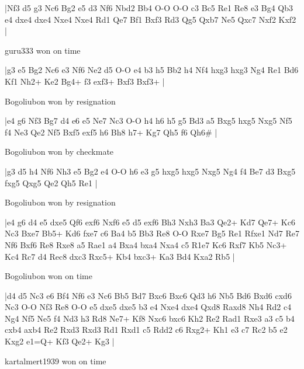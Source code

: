 \makegametitle
|Nf3 d5 g3 Nc6 Bg2 e5 d3 Nf6 Nbd2 Bb4 O-O O-O c3 Bc5 Re1 Re8 e3 Bg4 Qb3 e4 dxe4 dxe4 Nxe4 Nxe4 Rd1 Qe7 Bf1 Bxf3 Rd3 Qg5 Qxb7 Ne5 Qxc7 Nxf2 Kxf2  |

\showboard

guru333 won on time

\makegametitle
|g3 e5 Bg2 Nc6 e3 Nf6 Ne2 d5 O-O e4 b3 h5 Bb2 h4 Nf4 hxg3 hxg3 Ng4 Re1 Bd6 Kf1 Nh2+ Ke2 Bg4+ f3 exf3+ Bxf3 Bxf3+  |

\showboard

Bogoliubon won by resignation

\makegametitle
|e4 g6 Nf3 Bg7 d4 e6 e5 Ne7 Nc3 O-O h4 h6 h5 g5 Bd3 a5 Bxg5 hxg5 Nxg5 Nf5 f4 Ne3 Qe2 Nf5 Bxf5 exf5 h6 Bh8 h7+ Kg7 Qh5 f6 Qh6\#  |

\showboard

Bogoliubon won by checkmate

\makegametitle
|g3 d5 h4 Nf6 Nh3 e5 Bg2 e4 O-O h6 e3 g5 hxg5 hxg5 Nxg5 Ng4 f4 Be7 d3 Bxg5 fxg5 Qxg5 Qe2 Qh5 Re1  |

\showboard

Bogoliubon won by resignation

\makegametitle
|e4 g6 d4 e5 dxe5 Qf6 exf6 Nxf6 e5 d5 exf6 Bh3 Nxh3 Ba3 Qe2+ Kd7 Qe7+ Kc6 Nc3 Bxe7 Bb5+ Kd6 fxe7 c6 Ba4 b5 Bb3 Re8 O-O Rxe7 Bg5 Re1 Rfxe1 Nd7 Re7 Nf6 Bxf6 Re8 Rxe8 a5 Rae1 a4 Bxa4 bxa4 Nxa4 c5 R1e7 Kc6 Rxf7 Kb5 Nc3+ Kc4 Rc7 d4 Rec8 dxc3 Rxc5+ Kb4 bxc3+ Ka3 Bd4 Kxa2 Rb5  |

\showboard

Bogoliubon won on time

\makegametitle
|d4 d5 Nc3 e6 Bf4 Nf6 e3 Nc6 Bb5 Bd7 Bxc6 Bxc6 Qd3 h6 Nb5 Bd6 Bxd6 cxd6 Nc3 O-O Nf3 Re8 O-O e5 dxe5 dxe5 b3 e4 Nxe4 dxe4 Qxd8 Raxd8 Nh4 Rd2 c4 Ng4 Nf5 Ne5 f4 Nd3 h3 Rd8 Ne7+ Kf8 Nxc6 bxc6 Kh2 Re2 Rad1 Rxe3 a3 c5 b4 cxb4 axb4 Re2 Rxd3 Rxd3 Rd1 Rxd1 c5 Rdd2 c6 Rxg2+ Kh1 e3 c7 Rc2 b5 e2 Kxg2 e1=Q+ Kf3 Qe2+ Kg3  |

\showboard

kartalmert1939 won on time

